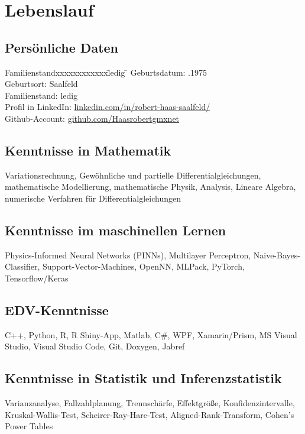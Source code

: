\documentclass[12pt,a4paper]{article}
\def\platz{Familienstandxxxxxxxxxxxx}
\begin{document}
\newpage


\section*{Lebenslauf}
\subsection*{Persönliche Daten}
\begin{tabbing}
\platz \= ledig \= \kill
Geburtsdatum: .1975 \\
Geburtsort: \> Saalfeld \\
Familienstand: \>  ledig \\
Profil in LinkedIn: \> \href{https://www.linkedin.com/in/robert-haas-saalfeld/}{\color{blue} linkedin.com/in/robert-haas-saalfeld/}\\
Github-Account: \> \href{https://github.com/Haasrobertgmxnet}{\color{blue} github.com/Haasrobertgmxnet}\\
\end{tabbing}
%
\subsection*{Kenntnisse in Mathematik}
Variationsrechnung, Gewöhnliche und partielle Differentialgleichungen, mathematische Modellierung, mathematische Physik, Analysis, Lineare Algebra, numerische Verfahren für Differentialgleichungen
%
\subsection*{Kenntnisse im maschinellen Lernen}
Physics-Informed Neural Networks (PINNs), Multilayer Perceptron, Naive-Bayes-Classifier, Support-Vector-Machines, OpenNN, MLPack, PyTorch, Tensorflow/Keras
%
\subsection*{EDV-Kenntnisse}
C++, Python, R, R Shiny-App, Matlab, C\#, WPF, Xamarin/Prism, MS Visual Studio, Visual Studio Code, Git, Doxygen, Jabref
%
\subsection*{Kenntnisse in Statistik und Inferenzstatistik}
Varianzanalyse, Fallzahlplanung, Trennschärfe, Effektgröße, Konfidenzintervalle, Kruskal-Wallis-Test, Scheirer-Ray-Hare-Test, Aligned-Rank-Transform, Cohen's Power Tables
%
\end{document}
